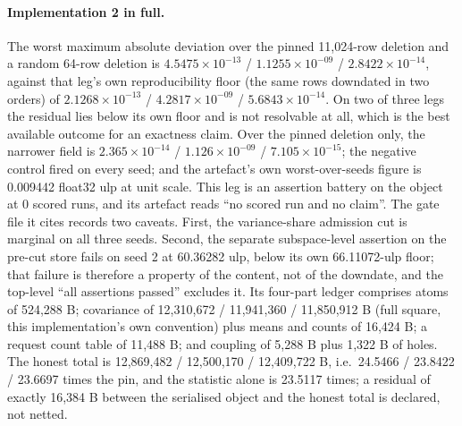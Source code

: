 \documentclass{article} %
\newcommand{\sci}[2]{\ensuremath{#1\times10^{#2}}}
\begin{document}
\paragraph{Implementation 2 in full.} The worst maximum absolute deviation over the pinned
11,024-row deletion and a random 64-row deletion is \sci{4.5475}{-13} / \sci{1.1255}{-09} /
\sci{2.8422}{-14}, against that leg's own reproducibility floor (the same rows downdated in two
orders) of \sci{2.1268}{-13} / \sci{4.2817}{-09} / \sci{5.6843}{-14}. On two of three legs the
residual lies below its own floor and is not resolvable at all, which is the best available outcome
for an exactness claim. Over the pinned deletion only, the narrower field is \sci{2.365}{-14} /
\sci{1.126}{-09} / \sci{7.105}{-15}; the negative control fired on every seed; and the artefact's
own worst-over-seeds figure is 0.009442 float32 ulp at unit scale. %
This leg is an assertion battery on the object at 0 scored runs, and its artefact reads ``no
scored run and no claim''. The gate file it cites records two caveats. First, the variance-share
admission cut is marginal on all three seeds. Second, the separate subspace-level assertion on the
pre-cut store fails on seed 2 at 60.36282 ulp, below its own 66.11072-ulp floor; that failure is
therefore a property of the content, not of the downdate, and the top-level ``all assertions
passed'' excludes it. %
Its four-part ledger comprises atoms of 524,288 B; covariance of 12,310,672 / 11,941,360 /
11,850,912 B (full square, this implementation's own convention) plus means and counts of 16,424
B; a request count table of 11,488 B; and coupling of 5,288 B plus 1,322 B of holes. The honest
total is 12,869,482 / 12,500,170 / 12,409,722 B, i.e.\ 24.5466 / 23.8422 / 23.6697 times the pin,
and the statistic alone is 23.5117 times; a residual of exactly 16,384 B between the serialised
object and the honest total is declared, not netted. %
\end{document}
